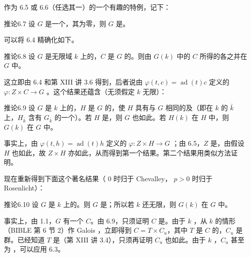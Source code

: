 作为 6.5 或 6.6（任选其一）的一个有趣的特例，记下：
\begin{SGAresult}{推论}{6.7}
设 $G$ 是一个，其为零，则 $G$ 是。
\end{SGAresult}
可以将 6.4 精确化如下。
\begin{SGAresult}{推论}{6.8}
设 $G$ 是无限域 $k$ 上的，$C$ 是 $G$ 的。则由 $G(k)$ 中的 $C$ 所得的各之并在 $G$ 中。
\end{SGAresult}
这立即由 6.4 和第 XIII 讲 3.6 得到，后者说由 $\varphi(t,c)=\operatorname{ad}(t)c$ 定义的 $\varphi:Z\times C\to G$ 。这个结果还蕴含（无须假定 $k$ 无限）：
\begin{SGAresult}{推论}{6.9}
设 $G$ 是 $k$ 上的，$H$ 是 $G$ 的，使 $H$ 具有与 $G$ 相同的及（即在 $k$ 的 $\bar k$ 上，$H_{\bar k}$ 含有 $G_{\bar k}$ 的一个）。若 $H$ 是，则 $G$ 也如此。若 $H(k)$ 在 $H$ 中，则 $G(k)$ 在 $G$ 中。
\end{SGAresult}
事实上，由 $\varphi(t,h)=\operatorname{ad}(t)h$ 定义的 $\varphi:Z\times H\to G$ ；由 6.5，$Z$ 是，由假设 $H$ 也如此，故 $Z\times H$ 亦如此，从而得到第一个结果。第二个结果用类似方法证明。

现在重新得到下面这个著名结果（ $0$ 时归于 Chevalley， $p>0$ 时归于 Rosenlicht）：
\begin{SGAresult}{推论}{6.10}
设 $G$ 是 $k$ 上的。则 $G$ 是；所以若 $k$ 还无限，则 $G(k)$ 在 $G$ 中。
\end{SGAresult}
事实上，由 1.1，$G$ 有一个 $C$。由 6.9，只须证明 $C$ 是。由于 $k$ ，从 $k$ 的情形（BIBLE 第 6 节 2）作 Galois ，立即得到 $C=T\times C_u$，其中 $T$ 是 $C$ 的，$C_u$ 是群。已经知道 $T$ 是（第 XIII 讲 3.4），只须再证明 $C_u$ 也如此。由于 $k$ ，$C_u$ 甚至为 ，可以应用 6.3。

